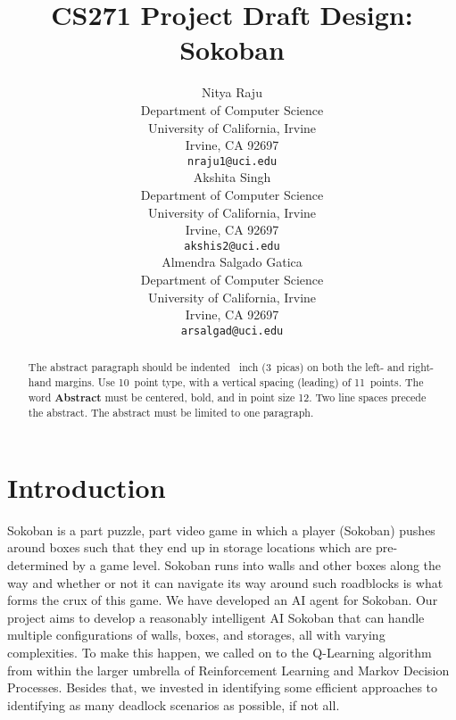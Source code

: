 \documentclass{article}
\title{CS271 Project Draft Design: Sokoban}
\author{
  Nitya Raju\\
  Department of Computer Science\\
  University of California, Irvine\\
  Irvine, CA 92697\\
  \texttt{nraju1@uci.edu} \\
   \And
  Akshita Singh \\
  Department of Computer Science\\
  University of California, Irvine\\
  Irvine, CA 92697\\
  \texttt{akshis2@uci.edu} \\
   \And
  Almendra Salgado Gatica \\
  Department of Computer Science\\
  University of California, Irvine\\
  Irvine, CA 92697\\
  \texttt{arsalgad@uci.edu} \\
}
\begin{document}
\maketitle

\begin{abstract}
  The abstract paragraph should be indented ~inch (3~picas) on
  both the left- and right-hand margins. Use 10~point type, with a vertical
  spacing (leading) of 11~points.  The word \textbf{Abstract} must be centered,
  bold, and in point size 12. Two line spaces precede the abstract. The abstract
  must be limited to one paragraph.
\end{abstract}

\section{Introduction}

Sokoban is a part puzzle, part video game in which a player (Sokoban) pushes around boxes such that they end up in storage locations which are pre-determined by a game level. Sokoban runs into walls and other boxes along the way and whether or not it can navigate its way around such roadblocks is what forms the crux of this game. We have developed an AI agent for Sokoban. Our project aims to develop a reasonably intelligent AI Sokoban that can handle multiple configurations of walls, boxes, and storages, all with varying complexities. To make this happen, we called on to the Q-Learning algorithm from within the larger umbrella of Reinforcement Learning and Markov Decision Processes. Besides that, we invested in identifying some efficient approaches to identifying as many deadlock scenarios as possible, if not all. 



\end{document}
